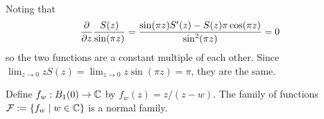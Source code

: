 \documentclass{homework}
\begin{document}
\begin{solution}
\begin{align*}
                                                                                                                                                \end{align*}
                                                                                                                                                Noting that
                                                                                                                                                \[
                                                                                                                                                \frac{\partial }{\partial z}\frac{S(z)}{\sin(\pi z)} = \frac{\sin(\pi z)S'(z) - S(z)\pi\cos(\pi z)}{\sin^2(\pi z)} = 0
                                                                                                                                                \]
                                                                                                                                                so the two functions are a constant multiple of each other. Since $\lim_{z\to 0 }zS(z) = \lim_{z\to 0} z\sin(\pi z)= \pi$, they are the same.

                                                                                                                                                \end{solution}
                                                                                                                                                \begin{problem}\label{normal-family-example}Define
                                                                                                                                                  $f_w : B_1(0) \to \mathbb{C}$ by $f_w(z) = z/(z-w)$.  The family of
                                                                                                                                                    functions $\mathcal{F} := \{ f_w \mid w \in \mathbb{C} \}$ is a normal
                                                                                                                                                      family.
                                                                                                                                                      \end{problem}
\end{document}

